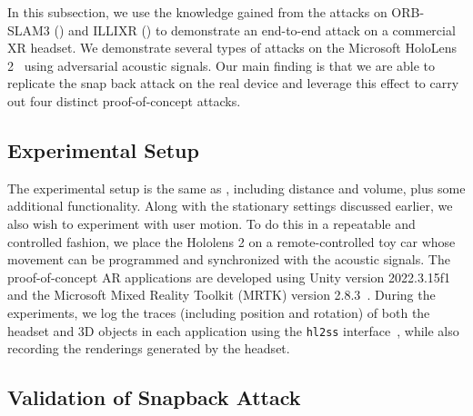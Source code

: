 In this subsection, we use the knowledge gained from the attacks on ORB-SLAM3 () and ILLIXR () to demonstrate an end-to-end attack on a commercial XR headset.
We demonstrate several types of attacks on the Microsoft HoloLens 2~\cite{ungureanu2020hololens} using adversarial acoustic signals.
Our main finding is that we are able to replicate the snap back attack on the real device and leverage this effect to carry out four distinct proof-of-concept attacks.





\subsection{Experimental Setup} 

The experimental setup is the same as , including distance and volume, plus some additional functionality.
Along with the stationary settings discussed earlier, we also wish to experiment with user motion.
To do this in a repeatable and controlled fashion, we place the Hololens 2 on a remote-controlled toy car whose movement can be programmed and synchronized with the acoustic signals. 
The proof-of-concept AR applications are developed using Unity version 2022.3.15f1~\cite{UnitySDK} and the Microsoft Mixed Reality Toolkit (MRTK) version 2.8.3~\cite{mrtk}. During the experiments, we log the traces (including position and rotation) of both the headset and 3D objects in each application using the \texttt{hl2ss} interface~\cite{dibene2022hololens}, while also recording the renderings generated by the headset.





\subsection{Validation of Snapback Attack}
\label{sec:snapback_effect}

